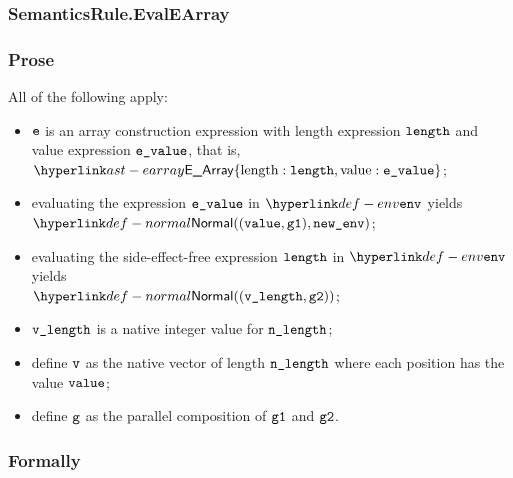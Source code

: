 \subsubsection{SemanticsRule.EvalEArray}
\subsubsection{Prose}
All of the following apply:
\begin{itemize}
  \item $\ve$ is an array construction expression with length expression $\elength$ and value expression $\evalue$,
        that is, $\EArray\{\EArrayLength: \elength, \EArrayValue: \evalue\}$;
  \item evaluating the expression $\evalue$ in $\env$ yields $\Normal((\vvalue, \vgone), \newenv)$\ProseOrAbnormal;
  \item evaluating the side-effect-free expression $\elength$ in $\env$ yields \\
        $\Normal((\vlength, \vgtwo))$\ProseOrError;
  \item $\vlength$ is a native integer value for $\nlength$;
  \item define $\vv$ as the native vector of length $\nlength$ where each position has the value $\vvalue$;
  \item define $\vg$ as the parallel composition of $\vgone$ and $\vgtwo$.
\end{itemize}

\subsubsection{Formally}
\begin{mathpar}
\end{mathpar}

